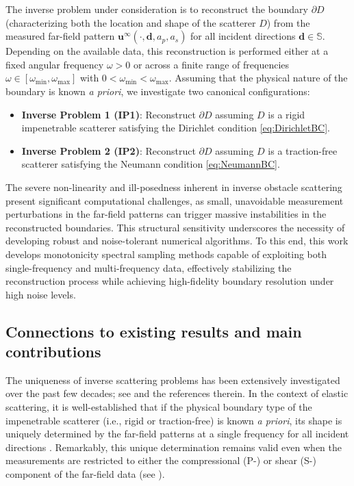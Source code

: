 \documentclass[11pt,reqno,twoside]{amsart}
\theoremstyle{definition}
\theoremstyle{remark}
\numberwithin{equation}{section}
\begin{document}
The inverse problem under consideration is to reconstruct the boundary $\partial D$ (characterizing both the location and shape of the scatterer $D$) from the measured far-field pattern $\mathbf{u}^\infty(\cdot, \mathbf{d}, a_p, a_s)$ for all incident directions $\mathbf{d} \in \mathbb{S}$. Depending on the available data, this reconstruction is performed either at a fixed angular frequency $\omega > 0$ or across a finite range of frequencies $\omega \in [\omega_{\min}, \omega_{\max}]$ with $0 < \omega_{\min} < \omega_{\max}$. Assuming that the physical nature of the boundary is known \emph{a priori}, we investigate two canonical configurations:
\begin{itemize}
    \item \textbf{Inverse Problem 1 (IP1)}: Reconstruct $\partial D$ assuming $D$ is a rigid impenetrable scatterer satisfying the Dirichlet condition \eqref{eq:DirichletBC}.
    \item \textbf{Inverse Problem 2 (IP2)}: Reconstruct $\partial D$ assuming $D$ is a traction-free scatterer satisfying the Neumann condition \eqref{eq:NeumannBC}.
\end{itemize}
The severe non-linearity and ill-posedness inherent in inverse obstacle scattering present significant computational challenges, as small, unavoidable measurement perturbations in the far-field patterns can trigger massive instabilities in the reconstructed boundaries. This structural sensitivity underscores the necessity of developing robust and noise-tolerant numerical algorithms. To this end, this work develops monotonicity spectral sampling methods capable of exploiting both single-frequency and multi-frequency data, effectively stabilizing the reconstruction process while achieving high-fidelity boundary resolution under high noise levels.






	

\subsection{Connections to existing results and main contributions}

The uniqueness of inverse scattering problems has been extensively investigated over the past few decades; see \cite{CK19, DFL26, DGLY23, DGT25, DLM25, KS14, KS15, GS12, HKS12} and the references therein. In the context of elastic scattering, it is well-established that if the physical boundary type of the impenetrable scatterer (i.e., rigid or traction-free) is known \emph{a priori}, its shape is uniquely determined by the far-field patterns at a single frequency for all incident directions \cite{KS14, KS15, GS12, HKS12}. Remarkably, this unique determination remains valid even when the measurements are restricted to either the compressional (P-) or shear (S-) component of the far-field data (see \cite{GS12,KS15}).
\end{document}
